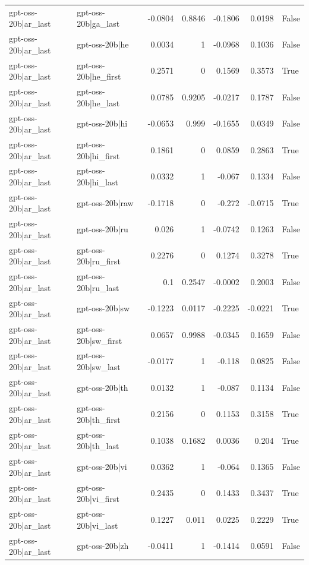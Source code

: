 \begin{table}
\begin{tabular}{l l r r r r l}
gpt-oss-20b|ar_last & gpt-oss-20b|ga_last & -0.0804 & 0.8846 & -0.1806 & 0.0198 & False \\
gpt-oss-20b|ar_last & gpt-oss-20b|he & 0.0034 & 1 & -0.0968 & 0.1036 & False \\
gpt-oss-20b|ar_last & gpt-oss-20b|he_first & 0.2571 & 0 & 0.1569 & 0.3573 & True \\
gpt-oss-20b|ar_last & gpt-oss-20b|he_last & 0.0785 & 0.9205 & -0.0217 & 0.1787 & False \\
gpt-oss-20b|ar_last & gpt-oss-20b|hi & -0.0653 & 0.999 & -0.1655 & 0.0349 & False \\
gpt-oss-20b|ar_last & gpt-oss-20b|hi_first & 0.1861 & 0 & 0.0859 & 0.2863 & True \\
gpt-oss-20b|ar_last & gpt-oss-20b|hi_last & 0.0332 & 1 & -0.067 & 0.1334 & False \\
gpt-oss-20b|ar_last & gpt-oss-20b|raw & -0.1718 & 0 & -0.272 & -0.0715 & True \\
gpt-oss-20b|ar_last & gpt-oss-20b|ru & 0.026 & 1 & -0.0742 & 0.1263 & False \\
gpt-oss-20b|ar_last & gpt-oss-20b|ru_first & 0.2276 & 0 & 0.1274 & 0.3278 & True \\
gpt-oss-20b|ar_last & gpt-oss-20b|ru_last & 0.1 & 0.2547 & -0.0002 & 0.2003 & False \\
gpt-oss-20b|ar_last & gpt-oss-20b|sw & -0.1223 & 0.0117 & -0.2225 & -0.0221 & True \\
gpt-oss-20b|ar_last & gpt-oss-20b|sw_first & 0.0657 & 0.9988 & -0.0345 & 0.1659 & False \\
gpt-oss-20b|ar_last & gpt-oss-20b|sw_last & -0.0177 & 1 & -0.118 & 0.0825 & False \\
gpt-oss-20b|ar_last & gpt-oss-20b|th & 0.0132 & 1 & -0.087 & 0.1134 & False \\
gpt-oss-20b|ar_last & gpt-oss-20b|th_first & 0.2156 & 0 & 0.1153 & 0.3158 & True \\
gpt-oss-20b|ar_last & gpt-oss-20b|th_last & 0.1038 & 0.1682 & 0.0036 & 0.204 & True \\
gpt-oss-20b|ar_last & gpt-oss-20b|vi & 0.0362 & 1 & -0.064 & 0.1365 & False \\
gpt-oss-20b|ar_last & gpt-oss-20b|vi_first & 0.2435 & 0 & 0.1433 & 0.3437 & True \\
gpt-oss-20b|ar_last & gpt-oss-20b|vi_last & 0.1227 & 0.011 & 0.0225 & 0.2229 & True \\
gpt-oss-20b|ar_last & gpt-oss-20b|zh & -0.0411 & 1 & -0.1414 & 0.0591 & False \\

\end{tabular}
\end{table}
